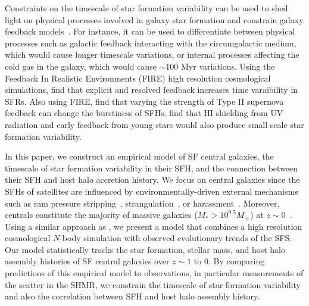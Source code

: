 \documentclass[12pt, letterpaper, preprint, tighten]{aastex62}
\begin{document}
Constraints on the timescale of star formation variability can be used to 
shed light on physical processes involved in galaxy star formation and 
constrain galaxy feedback models~\citep{sparre2015}. For instance, 
it can be used to differentiate between physical processes such 
as galactic feedback interacting with the circumgalactic medium, which 
would cause longer timescale variations, or internal processes affecting 
the cold gas in the galaxy, which would cause $\sim 100$ Myr variations. 
Using the Feedback In Realistic Environments (FIRE) high resolution 
cosmological simulations, \cite{hopkins2014} find that 
explicit and resolved feedback increases time varaibility in SFRs. 
Also using FIRE, \cite{sparre2017} find that varying the strength of 
Type II supernova feedback can change the burstiness of SFHs. 
\cite{governato2015} find that HI shielding from UV radiation and 
early feedback from young stars would also produce small scale star 
formation variability.

In this paper, we construct an empirical model of SF central galaxies, 
the timescale of star formation variability in their 
SFH, and the connection between their SFH and host halo accretion history. 
We focus on central galaxies since the SFHs of satellites are influenced 
by environmentally-driven external mechanisms such as ram pressure 
stripping~\citep{gunn1972,bekki2009}, strangulation~\citep{larson1980, peng2015}, 
or harassment~\citep{moore1998}. Moreover, centrals constitute the majority 
of massive galaxies ($M_*>10^{9.5}M_\sun$) at $z\sim0$~\citep{wetzel2013}. 
Using a similar approach as \cite{wetzel2013, hahn2017b}, we present a model 
that combines a high resolution cosmological $N$-body simulation with 
observed evolutionary trends of the SFS. Our model statistically tracks 
the star formation, stellar mass, and host halo assembly histories of SF 
central galaxies over $z\sim1$ to $0$. By comparing predictions of this empirical 
model to observations, in particular measurements of the scatter in the 
SHMR, we constrain the timescale of star formation variability and also 
the correlation between SFH and host halo assembly history.  
\end{document}
